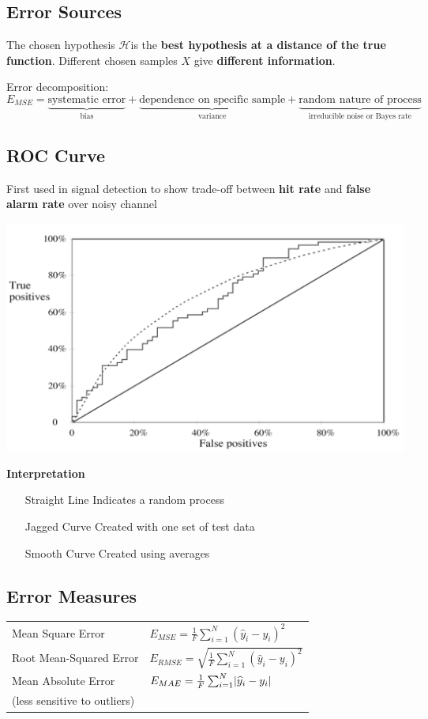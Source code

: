 \documentclass[11pt]{article}
\theoremstyle{definition}
\newcommand*\Hilbert{\ensuremath{\mathcal{H}}}
\DeclarePairedDelimiter\abs{\lvert}{\rvert}
\begin{document}
\subsection{Error Sources}

The chosen hypothesis \Hilbert is the \textbf{best hypothesis at a distance of the true function}. Different chosen samples $X$ give \textbf{different information}.

\noindent
Error decomposition:
\begin{equation*}
	E_{MSE} = \underbrace{\text{systematic error}}_{\text{bias}} + \underbrace{\text{dependence on specific sample}}_{\text{variance}}  + \underbrace{\text{random nature of process}}_{\text{irreducible noise or Bayes rate}}
\end{equation*}

\subsection{ROC Curve}
First used in signal detection to show trade-off between \textbf{hit rate} and \textbf{false alarm rate} over noisy channel

\begin{center}
	\includegraphics[width=0.7\linewidth]{img/ROC_curve}
\end{center}

\noindent
\textbf{Interpretation}
\begin{itemize}[leftmargin=*, labelindent=3cm, labelsep=1cm]
	\item[Straight Line] Indicates a random process
	\item[Jagged Curve] Created with one set of test data
	\item[Smooth Curve] Created using averages
\end{itemize}

\subsection{Error Measures}
\begin{tabularx}{\linewidth}{lX}
	Mean Square Error & $ E_{MSE} = \frac{1}{F}\sum_{i=1}^{N} (\widehat{y}_i - y_i)^2 $\\
	Root Mean-Squared Error & $E_{RMSE} = \sqrt{\frac{1}{F}\sum_{i=1}^{N} (\widehat{y}_i - y_i)^2 } $\\
	Mean Absolute Error & $ E_{MAE} = \frac{1}{F}\sum_{i=1}^{N} \abs{\widehat{y}_i - y_i}$\\
	(less sensitive to outliers)
\end{tabularx}
\end{document}
